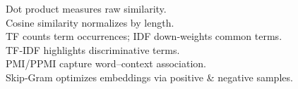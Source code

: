 \documentclass[preview]{standalone}
\begin{document}
Dot product measures raw similarity.\\Cosine similarity normalizes by length.\\TF counts term occurrences; IDF down‑weights common terms.\\TF‑IDF highlights discriminative terms.\\PMI/PPMI capture word–context association.\\Skip‑Gram optimizes embeddings via positive & negative samples.\\
\end{document}
